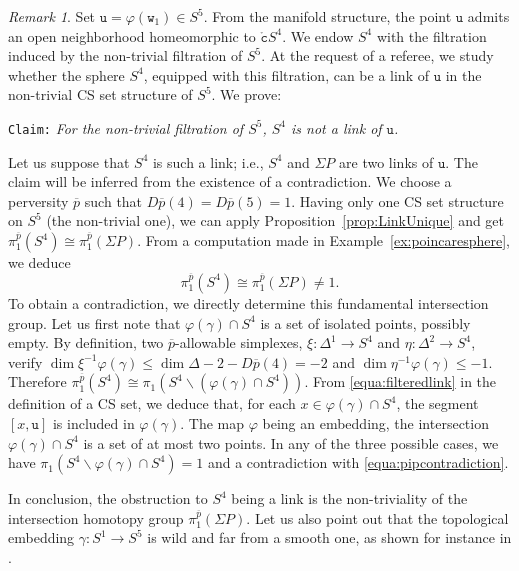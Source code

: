 \documentclass[a4paper,10pt,english,reqno]{amsart}
\theoremstyle{plain}
\theoremstyle{definition}
\theoremstyle{remark}
\newtheorem{remark}[proposition]{Remark}
\numberwithin{equation}{section}
\newcommand{\propref}[1]{Proposition~\ref{#1}}
\newcommand{\exemref}[1]{Example~\ref{#1}}
\def\ov{\overline}
\def\tc{{\mathtt c}}
\def\tu{{\mathtt u}}
\def\tw{{\mathtt w}}
\def\rc{{\mathring{\tc}}}
\def\menos{\backslash}
\renewcommand\1{\hbox{\ding{192}}}
\renewcommand\2{\hbox{\ding{193}}}
\newcommand\3{\hbox{\ding{194}}}
\newcommand\4{\hbox{\ding{195}}}
\begin{document}
\begin{remark}
\smallskip
Set $\tu=\varphi(\tw_{1})\in S^5$. From  the manifold structure, the point $\tu$ admits an open neighborhood
homeomorphic to $\rc S^4$. We endow $S^4$ with the filtration induced by the non-trivial filtration of $S^5$.
At the request of a referee, we study whether the sphere $S^4$,
 equipped with this filtration, can be a link of $\tu$ in the non-trivial CS set structure of $S^5$. 
We prove:

\noindent\centerline{
{\tt{Claim:}} \emph{For the non-trivial filtration of $S^5$, $S^4$ is not a link of $\tu$.}
}

\smallskip
Let us suppose that $S^4$ is such a link; i.e.,
$S^4$ and $\Sigma P$ are two links of $\tu$.
The claim will be inferred from the existence of a contradiction.
We choose a perversity $\ov{p}$ such that $D\ov{p}(4)=D\ov{p}(5)=1$.
Having only one CS set structure on $S^5$ (the non-trivial one), we can apply
\propref{prop:LinkUnique} and get $\pi_{1}^{\ov{p}}(S^4)\cong \pi_{1}^{\ov{p}}(\Sigma P)$.
From a computation made in \exemref{ex:poincaresphere}, we deduce 
\begin{equation}\label{equa:pipcontradiction}
\pi_{1}^{\ov{p}}(S^4)\cong \pi_{1}^{\ov{p}}(\Sigma P)\neq 1.
\end{equation}
To obtain a contradiction, we directly determine this fundamental intersection group.
%
Let us first note that $\varphi(\gamma)\cap S^4$ is a set of isolated points, possibly empty.
By definition,  two $\ov{p}$-allowable simplexes,
$\xi\colon \Delta^1 \to S^4$ and $\eta\colon \Delta^2\to S^4$,
  verify
$\dim\xi^{-1}\varphi(\gamma)\leq \dim \Delta-2-D\ov{p}(4)=-2$
and $\dim\eta^{-1}\varphi(\gamma)\leq -1$.
Therefore $\pi_{1}^{\ov{p}}(S^4)\cong \pi_{1}(S^4\menos (\varphi(\gamma)\cap S^4))$.
 From \eqref{equa:filteredlink} in the definition 
 of a CS set, we deduce that, 
for each $x\in \varphi(\gamma)\cap S^4$, the segment $[x,\tu]$ is included in $\varphi(\gamma)$.
The map $\varphi$ being an embedding, the intersection
$\varphi(\gamma)\cap S^4$
is a set of at most two points. In any of the three possible cases, we have 
$\pi_{1}(S^4\menos\varphi(\gamma)\cap S^4)=1$ and a contradiction with \eqref{equa:pipcontradiction}.
%
% 

\smallskip
In conclusion, the obstruction to $S^4$ being a link is the non-triviality of the intersection homotopy group 
$\pi_{1}^{\ov{p}}(\Sigma P)$.
%
Let us also point out that the topological embedding $\gamma\colon S^1\to S^5$ is  wild and far 
from a smooth one, as shown for instance in \cite{MR4030354}.
% 
 \end{remark}
\end{document}

